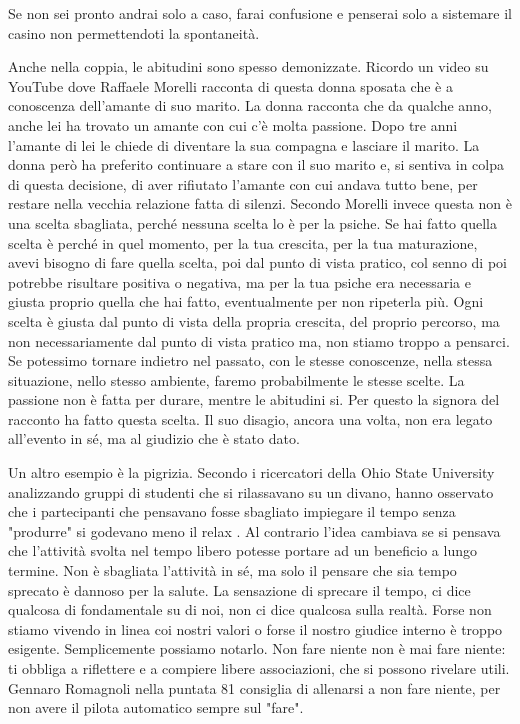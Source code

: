 \documentclass[12pt]{book} %
\begin{document}
\begin{mdframed}[linewidth=1pt]
Se non sei pronto andrai solo a caso, farai confusione e penserai solo a sistemare il casino non permettendoti la spontaneità.

Anche nella coppia, le abitudini sono spesso demonizzate. Ricordo un video su YouTube dove Raffaele Morelli racconta di
questa donna sposata che è a conoscenza dell'amante di suo marito. La donna racconta che da
qualche anno, anche lei ha trovato un amante con cui c'è molta passione. Dopo tre anni l'amante di lei le
chiede di diventare la sua compagna e lasciare il marito. La donna però ha preferito continuare a stare con il suo
marito e, si sentiva in colpa di questa decisione, di aver rifiutato l'amante con cui andava tutto
bene, per restare nella vecchia relazione fatta di silenzi. Secondo Morelli invece questa non è una scelta sbagliata,
perché nessuna scelta lo è per la psiche. Se hai fatto quella scelta è perché in quel momento, per la tua crescita, per
la tua maturazione, avevi bisogno di fare quella scelta, poi dal punto di vista pratico, col senno di poi potrebbe
risultare positiva o negativa, ma per la tua psiche era necessaria e giusta proprio quella che hai fatto, eventualmente
per non ripeterla più. Ogni scelta è giusta dal punto di vista della propria crescita, del proprio percorso, ma non necessariamente 
dal punto di vista pratico ma, non stiamo troppo a pensarci. Se potessimo tornare indietro nel
passato, con le stesse conoscenze, nella stessa situazione, nello stesso ambiente, faremo probabilmente le stesse scelte.
La passione non è fatta per durare, mentre le abitudini si. Per questo la signora del racconto ha fatto questa scelta.
Il suo disagio, ancora una volta, non era legato all'evento in sé, ma al giudizio che è stato dato.

Un altro esempio è la pigrizia. Secondo i ricercatori della Ohio State University analizzando gruppi di studenti che si
rilassavano su un divano, hanno osservato che i partecipanti che pensavano fosse sbagliato impiegare il tempo senza
"produrre" si godevano meno il relax . Al contrario l'idea cambiava se
si pensava che l'attività svolta nel tempo libero potesse portare ad un beneficio a lungo termine. Non è sbagliata
l'attività in sé, ma solo il pensare che sia tempo sprecato è dannoso per la salute. La sensazione
di sprecare il tempo, ci dice qualcosa di fondamentale su di noi, non ci dice qualcosa sulla realtà. Forse non stiamo
vivendo in linea coi nostri valori o forse il nostro giudice interno è troppo esigente. Semplicemente possiamo notarlo. Non
fare niente non è mai fare niente: ti obbliga a riflettere e a compiere libere associazioni, che si possono rivelare
utili. Gennaro Romagnoli nella puntata 81 consiglia di allenarsi a non fare niente, per non avere il pilota automatico sempre sul "fare".
\end{mdframed}
\end{document}
